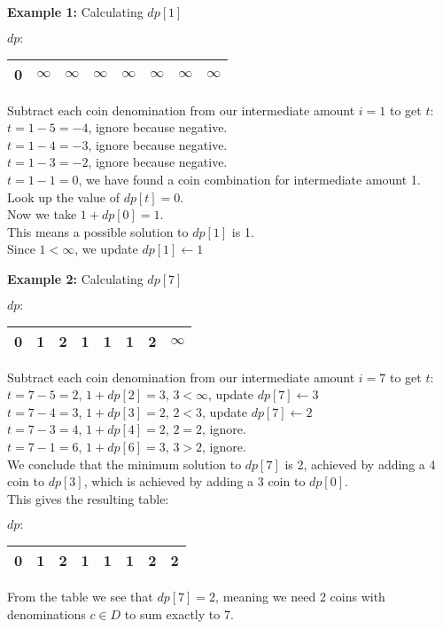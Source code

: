 \textbf{Example 1:} Calculating $dp[1]$
\begin{table}[H]
    \centering
    $dp:$
    \begin{tabular}{|c|c|c|c|c|c|c|c|}
        \hline
        0 & $\infty$ & $\infty$ & $\infty$ & $\infty$ & $\infty$ & $\infty$ & $\infty$ \\
        \hline
    \end{tabular}
\end{table}
Subtract each coin denomination from our intermediate amount $i=1$ to get $t$:\\
$t = 1-5 = -4$, ignore because negative.\\
$t = 1-4 = -3$, ignore because negative.\\
$t = 1-3 = -2$, ignore because negative.\\
$t = 1-1 = 0$, we have found a coin combination for intermediate amount 1.\\
Look up the value of $dp[t] = 0$.\\
Now we take $1 + dp[0] = 1$.\\
This means a possible solution to $dp[1]$ is 1.\\
Since $1 < \infty$, we update $dp[1] \leftarrow 1$

\textbf{Example 2:} Calculating $dp[7]$
\begin{table}[H]
    \centering
    $dp:$
    \begin{tabular}{|c|c|c|c|c|c|c|c|}
        \hline
        0 & 1 & 2 & 1 & 1 & 1 & 2 & $\infty$ \\
        \hline
    \end{tabular}
\end{table}
Subtract each coin denomination from our intermediate amount $i=7$ to get $t$:\\
$t = 7-5 = 2$, $1 + dp[2] = 3$, $3 < \infty$, update $dp[7] \leftarrow 3$\\
$t = 7-4 = 3$, $1+dp[3] = 2$, $2 < 3$, update $dp[7] \leftarrow 2$\\
$t = 7-3 = 4$, $1+dp[4] = 2$, $2 = 2$, ignore.\\
$t = 7-1 = 6$, $1+dp[6] = 3$, $3 > 2$, ignore.\\

We conclude that the minimum solution to $dp[7]$ is 2, achieved by adding a 4 coin to $dp[3]$, which is achieved by adding a 3 coin to $dp[0]$.\\
This gives the resulting table:
\begin{table}[H]
    \centering
    $dp:$
    \begin{tabular}{|c|c|c|c|c|c|c|c|}
        \hline
        0 & 1 & 2 & 1 & 1 & 1 & 2 & 2 \\
        \hline
    \end{tabular}
\end{table}
From the table we see that $dp[7] = 2$, meaning we need 2 coins with denominations $c\in D$ to sum exactly to 7.\\

